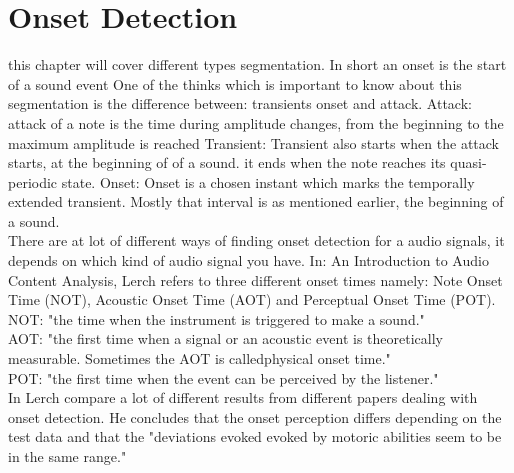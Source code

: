 \section{Onset Detection}
this chapter  will cover different types segmentation.
In short an onset is the start of a sound event \citep{ACA} 
One of the thinks which is important to know about this segmentation is the difference between: transients onset and attack. 
Attack: attack of a note is the time during amplitude changes, from the beginning to the maximum amplitude is reached \citep{ACA}
Transient: Transient also starts when the attack starts, at the beginning of of a sound. it ends when the note reaches its quasi-periodic state. \citep{ACA}
Onset: Onset is a chosen instant which marks the temporally extended transient. \citep{Bello2005} Mostly that interval is as mentioned earlier, the beginning of a sound. 
\\
There are at lot of different ways of finding onset detection for a audio signals, it depends on which kind of audio signal you have.
In: An Introduction to Audio Content Analysis, \citep{ACA} Lerch refers to three different onset times namely: Note Onset Time (NOT), Acoustic Onset Time (AOT) and Perceptual Onset Time (POT).
\\
NOT: "the time when the instrument is triggered to make a sound." \citep{ACA}
\\
AOT: "the first time when a signal or an acoustic event is theoretically measurable. Sometimes the AOT is calledphysical onset time." \citep{ACA}
\\
POT: "the first time when the event can be perceived by the
listener." \citep{ACA}
\\
In \citep{ACA} Lerch compare a lot of different results from different papers dealing with onset detection. He concludes that the onset perception differs depending on the test data and that the "deviations evoked evoked by motoric abilities seem to be in the same range." \citep{ACA}
